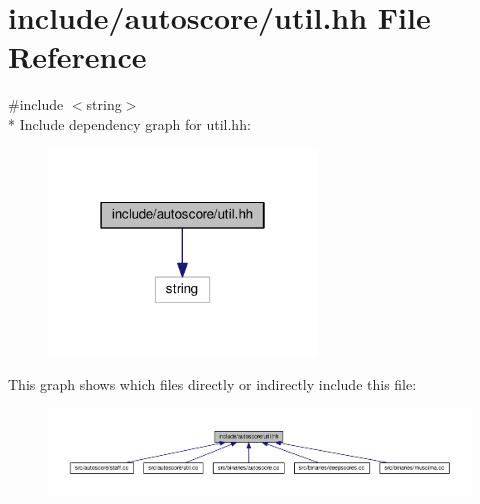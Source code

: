\hypertarget{util_8hh}{}\section{include/autoscore/util.hh File Reference}
\label{util_8hh}
{\ttfamily \#include $<$string$>$}\\*
Include dependency graph for util.\+hh\+:\nopagebreak
\begin{figure}[H]
\begin{center}
\leavevmode
\includegraphics[width=202pt]{util_8hh__incl}
\end{center}
\end{figure}
This graph shows which files directly or indirectly include this file\+:\nopagebreak
\begin{figure}[H]
\begin{center}
\leavevmode
\includegraphics[width=350pt]{util_8hh__dep__incl}
\end{center}
\end{figure}
